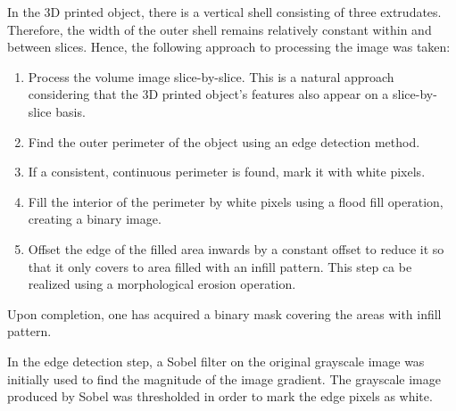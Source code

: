 \documentclass[a4paper,twoside,12pt]{article}
\begin{document}
In the 3D printed object, there is a vertical shell consisting of three extrudates. Therefore, the width of the outer shell remains relatively constant within and between slices. Hence, the following approach to processing the image was taken:
\begin{enumerate}
    \item Process the volume image slice-by-slice. This is a natural approach considering that the 3D printed object's features also appear on a slice-by-slice basis.
    \item Find the outer perimeter of the object using an edge detection method.
    \item If a consistent, continuous perimeter is found, mark it with white pixels.
    \item Fill the interior of the perimeter by white pixels using a flood fill operation, creating a binary image.
    \item \label{step:erosion} Offset the edge of the filled area inwards by a constant offset to reduce it so that it only covers to area filled with an infill pattern. This step ca be realized using a morphological erosion operation.
\end{enumerate}
Upon completion, one has acquired a binary mask covering the areas with infill pattern.

In the edge detection step, a Sobel filter on the original grayscale image was initially used to find the magnitude of the image gradient. The grayscale image produced by Sobel was thresholded in order to mark the edge pixels as white.
\end{document}
